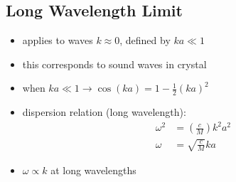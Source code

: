\documentclass[a4paper,11pt,normalem]{article}
\begin{document}
\subsection{Long Wavelength Limit}

\begin{itemize}
    \item applies to waves \(k \approx 0\), defined by \(ka \ll 1\)
    \item this corresponds to sound waves in crystal
    \item when \(ka \ll 1 \to \cos(ka) = 1 -\frac{1}{2}(ka)^2\)
    \item dispersion relation (long wavelength):
        \begin{align*}
            \omega^2 &= \left(\frac{c}{M}\right)k^2a^2 \\
            \omega &= \sqrt{\frac{c}{M}}ka
        \end{align*}
    \item \(\omega \propto k\) at long wavelengths
\end{itemize}

\section{}
\end{document}
